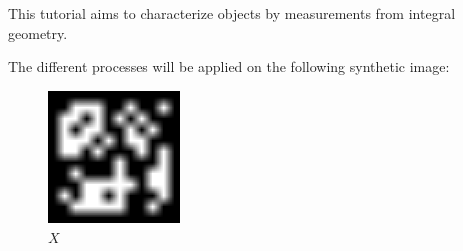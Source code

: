\def\difficulty{1}

\label{tutorial:integral_geometry:enonce}

\begin{note}This tutorial aims to characterize objects by measurements from integral geometry.
\end{note}


The different processes will be applied on the following synthetic image:
\vspace*{-5pt}
\begin{figure}[H]
\centering
\includegraphics[height=3.5cm]{X.png}
\caption{$X$}
\label{fig:integral_geometry:enonce:X}
\end{figure}

\vspace*{-10pt}

